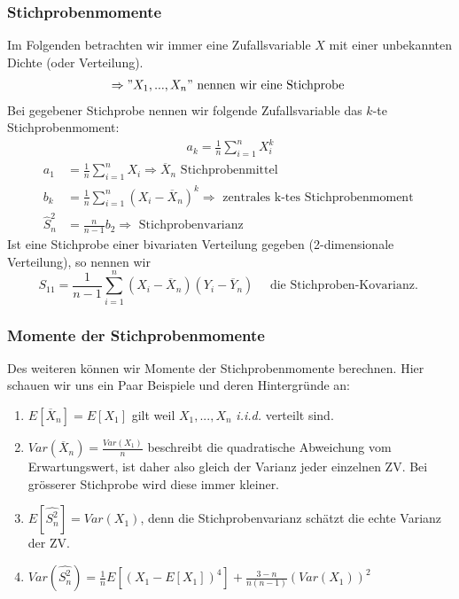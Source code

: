 \documentclass[a4paper]{article}
\begin{document}
\begin{theorem} %
	\subsubsection{Stichprobenmomente}

	Im Folgenden betrachten wir immer eine Zufallsvariable $X$ mit einer unbekannten
	Dichte (oder Verteilung).
	\begin{align*}
		\Rightarrow "
		X_1, ..., X_{n}
		"
		\text{ nennen wir eine Stichprobe }
	\end{align*}
	Bei gegebener Stichprobe nennen wir folgende Zufallsvariable
	das $k$-te Stichprobenmoment:
	\begin{align*}
		a_k = \frac{ 1 }{ n } \sum_{i=1}^{n} X_{i} ^{k}
	\end{align*}
	\begin{align*}
		a_1 &= \frac{ 1 }{ n } \sum_{i=1}^{n} X_i
		\Rightarrow \overline{X}_n \text{ Stichprobenmittel } \\
		b_k &= \frac{ 1 }{ n } \sum_{i=1}^{n} (X_i - \overline{X}_n) ^{k}
		\Rightarrow \text{ zentrales k-tes Stichprobenmoment } \\
		\hat{S}_n ^{2} &= \frac{ n }{ n-1 } b_2
		\Rightarrow \text{ Stichprobenvarianz }
	\end{align*}
	Ist eine Stichprobe einer bivariaten Verteilung gegeben (2-dimensionale
	Verteilung), so nennen wir
	\[
		S_{11} = \frac{ 1 }{ n-1 } \sum_{i=1}^{n} (X_i - \overline{X}_n)
		(Y_i - \overline{Y}_n) \quad \text{ die Stichproben-Kovarianz. }
	\]
\end{theorem}

\subsubsection{Momente der Stichprobenmomente}

\begin{theorem}
	Des weiteren können wir Momente der Stichprobenmomente berechnen.
	Hier schauen wir uns ein Paar Beispiele und deren Hintergründe an:
	\begin{enumerate}
		\item $E \left[
			\overline{X}_n
		\right] = E \left[
			X_1
		\right] $ gilt weil $X_1, ..., X_{n}$ \textit{i.i.d.} verteilt sind.
	\item $Var (\overline{X}_n) = \frac{ Var(X_1) }{ n }$
		 beschreibt die quadratische Abweichung vom Erwartungswert,
		 ist daher also gleich der Varianz jeder einzelnen ZV.
		 Bei grösserer Stichprobe wird diese immer kleiner.
	 \item $E \left[
			\hat{S_n ^2}
		\right] = Var(X_1)$, denn die Stichprobenvarianz schätzt die echte
		Varianz der ZV.
	\item $Var( \hat{S_n ^2} ) = \frac{ 1 }{ n } E \left[
			(X_1 - E \left[
				X_1
			\right] ) ^{4}
		\right] + \frac{ 3-n }{ n(n-1) } (Var (X_1))^2$
	\end{enumerate}
\end{theorem}
\end{document}
